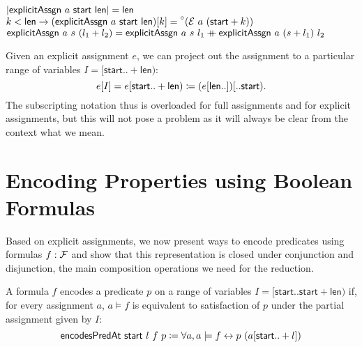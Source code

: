 \begin{lemma}\leavevmode
  \begin{enumerate}
     $|\textsf{explicitAssgn}~a~\textsf{start}~\textsf{len}| = \textsf{len}$
     $k < \textsf{len} \rightarrow (\textsf{explicitAssgn}~a~\textsf{start}~\textsf{len})[k] = \prescript{\circ}{}(\mathcal{E}~a~(\textsf{start} + k))$
     $\textsf{explicitAssgn}~a~s~(l_1 + l_2) = \textsf{explicitAssgn}~a~s~l_1 \mathbin{+\mkern-10mu+} \textsf{explicitAssgn}~a~(s + l_1)~l_2$ 
  \end{enumerate}
\end{lemma}


\newcommand{\projVars}{\textsf{projVars}}
Given an explicit assignment $e$, we can project out the assignment to a particular range of variables $I = [\textsf{start}.. +\textsf{len})$:
\[e[I] = e[\textsf{start}..+\textsf{len}) \coloneqq (e[\textsf{len} ..])[.. \textsf{start}).\] 
The subscripting notation thus is overloaded for full assignments and for explicit assignments, but this will not pose a problem as it will always be clear from the context what we mean.

\section{Encoding Properties using Boolean Formulas}
Based on explicit assignments, we now present ways to encode predicates using formulas $f : \mathcal{F}$ and show that this representation is closed under conjunction and disjunction, the main composition operations we need for the reduction.

\newcommand{\encodesPred}{\textsf{encodesPredAt}}
\begin{definition}
  \mnote[encodesPredicateAt]{\encodesPred}
  A formula $f$ encodes a predicate $p$ on a range of variables $I = [\textsf{start}.. \textsf{start} + \textsf{len})$ if, for every assignment $a$, $a \models f$ is equivalent to satisfaction of $p$ under the partial assignment given by $I$:
  \[\encodesPred~\textsf{start}~l~f~p \defeq \forall a, a \models f \leftrightarrow p~(a[\textsf{start}.. + l]) \]
\end{definition}

